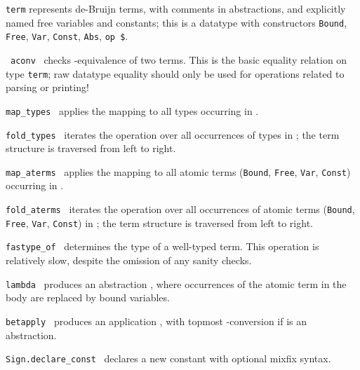 \begin{isabellebody}
\begin{isamarkuptext}
\begin{description}
  \item \verb|term| represents de-Bruijn terms, with comments in
  abstractions, and explicitly named free variables and constants;
  this is a datatype with constructors \verb|Bound|, \verb|Free|, \verb|Var|, \verb|Const|, \verb|Abs|, \verb|op $|.

  \item {}~\verb|aconv|~ checks \isa{{\isasymalpha}}-equivalence of two terms.  This is the basic equality relation
  on type \verb|term|; raw datatype equality should only be used
  for operations related to parsing or printing!

  \item \verb|map_types|~ applies the mapping  to all types occurring in .

  \item \verb|fold_types|~ iterates the operation  over all occurrences of types in ; the term
  structure is traversed from left to right.

  \item \verb|map_aterms|~ applies the mapping 
  to all atomic terms (\verb|Bound|, \verb|Free|, \verb|Var|, \verb|Const|) occurring in .

  \item \verb|fold_aterms|~ iterates the operation  over all occurrences of atomic terms (\verb|Bound|, \verb|Free|,
  \verb|Var|, \verb|Const|) in ; the term structure is
  traversed from left to right.

  \item \verb|fastype_of|~ determines the type of a
  well-typed term.  This operation is relatively slow, despite the
  omission of any sanity checks.

  \item \verb|lambda|~ produces an abstraction , where occurrences of the atomic term  in the
  body  are replaced by bound variables.

  \item \verb|betapply|~ produces an application , with topmost \isa{{\isasymbeta}}-conversion if  is an
  abstraction.

  \item \verb|Sign.declare_const|~
  declares a new constant  with optional mixfix
  syntax.


\end{description}
\end{isamarkuptext}
\end{isabellebody}
